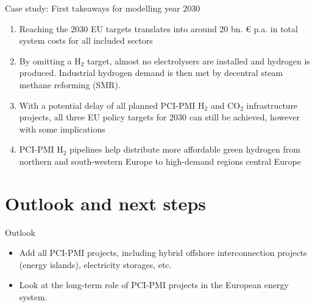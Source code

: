 \documentclass[10pt,aspectratio=169,dvipsnames]{beamer}
\begin{document}
\begin{frame}{Case study: First takeaways for modelling year 2030}
  \footnotesize
  \begin{enumerate}
    \setlength\itemsep{1em}
      \item Reaching the 2030 EU targets translates into around 20 bn. € p.a. in total system costs for all included sectors
      \item By omitting a H$_2$ target, almost no electrolysers are installed and hydrogen is produced. Industrial hydrogen demand is then met by decentral steam methane reforming (SMR).
      \item With a potential delay of all planned PCI-PMI H$_2$ and CO$_2$ infrastructure projects, all three \alert{EU policy targets for 2030 can still be achieved}, however with some implications
      \item PCI-PMI H$_2$ pipelines help distribute more \alert{affordable green hydrogen} from northern and south-western Europe to high-demand regions central Europe
  

  


    
  \end{enumerate}

\end{frame}

\section{Outlook and next steps}
\begin{frame}{Outlook}
  \footnotesize
  \begin{itemize}
    \item Add all PCI-PMI projects, including hybrid offshore interconnection projects (energy islands), electricity storages, etc.
    \item Look at the long-term role of PCI-PMI projects in the European energy system.
  \end{itemize}
\end{frame}
\end{document}
